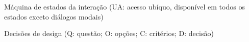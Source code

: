 \documentclass[conference]{IEEEtran}
\begin{document}
\begin{table}[!tp]
\caption{Máquina de estados da interação (UA: acesso ubíquo, disponível em todos os estados exceto diálogos modais)}
\label{tab:estados}
\centering

\end{table}


\begin{table}[!tp]
\caption{Decisões de design (Q: questão; O: opções; C: critérios; D: decisão)}
\label{tab:rationale}
\centering

\end{table}
\end{document}
